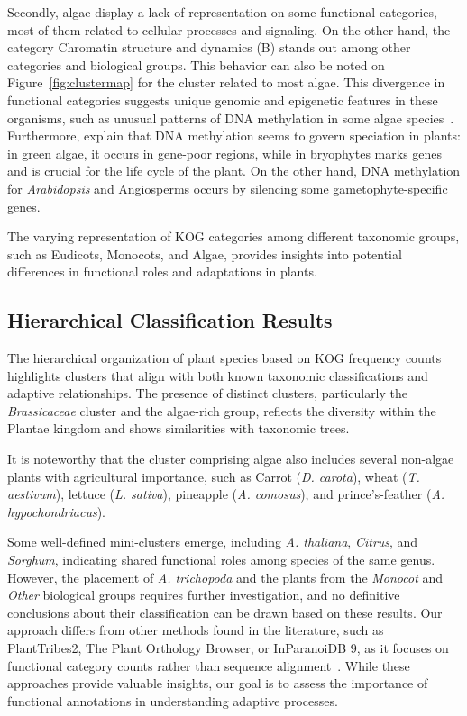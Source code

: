 Secondly, algae display a lack of representation on some 
functional categories, most of them related to cellular 
processes and signaling. On the other hand, the category 
Chromatin structure and dynamics (B) stands out among other 
categories and biological groups. This behavior can also 
be noted on Figure~\ref{fig:clustermap} for the cluster
related to most algae.
This divergence in functional categories suggests unique 
genomic and epigenetic features in these organisms, such 
as unusual patterns of DNA methylation in some algae 
species~\citep{bacova2020}. Furthermore, 
\cite{vigneau2021} explain that DNA methylation seems to govern 
speciation in plants: in green algae, it occurs in gene-poor 
regions, while in bryophytes marks genes and is crucial for the 
life cycle of the plant. On the other hand, DNA methylation for 
\emph{Arabidopsis} and Angiosperms occurs by silencing some 
gametophyte-specific genes.

The varying 
representation of KOG categories among different taxonomic 
groups, such as Eudicots, Monocots, and Algae, provides 
insights into potential differences in functional roles 
and adaptations in plants.


\subsection{Hierarchical Classification Results}
\label{sec:conclusion.hierarchy}

The hierarchical organization of plant species based on 
KOG frequency counts highlights clusters that align with 
both known taxonomic classifications and adaptive 
relationships. The presence of distinct clusters, 
particularly the \emph{Brassicaceae} cluster and the 
algae-rich group, reflects the diversity within the 
Plantae kingdom and shows similarities with taxonomic trees.

It is noteworthy that the cluster comprising algae also 
includes several non-algae plants with agricultural 
importance, such as  Carrot 
(\emph{D. carota}), wheat (\emph{T. aestivum}), lettuce 
(\emph{L. sativa}), pineapple (\emph{A. comosus}), and 
prince's-feather (\emph{A. hypochondriacus}).

Some well-defined mini-clusters emerge, including 
\emph{A. thaliana}, \emph{Citrus}, and \emph{Sorghum}, 
indicating shared functional roles among species of the 
same genus. However, the placement of 
\emph{A. trichopoda} and the plants from the 
\emph{Monocot} and \emph{Other} biological groups 
requires further investigation, and no definitive 
conclusions about their classification can be drawn 
based on these results.
Our approach differs from other methods found in the 
literature, such as PlantTribes2, The Plant Orthology 
Browser, or InParanoiDB 9, as it focuses on functional 
category counts rather than sequence 
alignment~\citep{wafula2023,tulpan2017, persson2023}. 
While these approaches provide valuable insights, our 
goal is to assess the importance of functional 
annotations in understanding adaptive processes.


